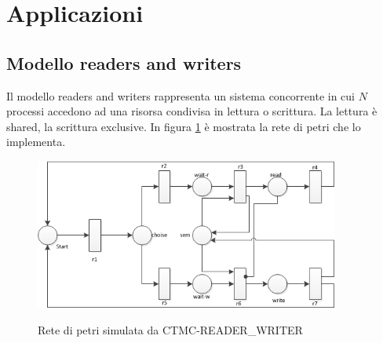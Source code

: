 \section{Applicazioni}

\subsection{Modello readers and writers}
Il modello readers and writers rappresenta un sistema concorrente in cui $N$
processi accedono ad una risorsa condivisa in lettura o scrittura. La lettura è
shared, la scrittura exclusive.  In figura \ref{petri2} è  mostrata la rete di
petri che lo implementa.

\begin{figure}[!hb]
	\includegraphics[width=10cm]{../resources/images/petri2.png}
	\label{petri2}
	\caption{Rete di petri simulata da CTMC-READER\_WRITER}
\end{figure}

